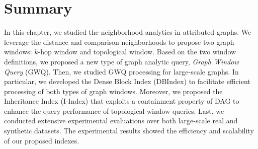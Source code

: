 \section{Summary}\label{gw:sec:concl}
In this chapter, we studied the neighborhood analytics in attributed graphs.
We leverage the distance and comparison neighborhoods to propose
two graph windows: $k$-hop window and topological window.
Based on the two window definitions, we proposed a new type of graph analytic query, \emph{Graph Window Query} (GWQ).
%
Then, we studied GWQ processing for large-scale graphs. In particular,
we developed the Dense Block Index (DBIndex) to facilitate efficient processing of both types of graph windows. Moreover, we proposed the Inheritance Index (I-Index) that exploits a containment property of DAG to enhance the query performance of topological window queries. 
Last, we conducted extensive experimental evaluations over both large-scale real and synthetic datasets. The experimental results showed the efficiency and scalability of our proposed indexes. 


